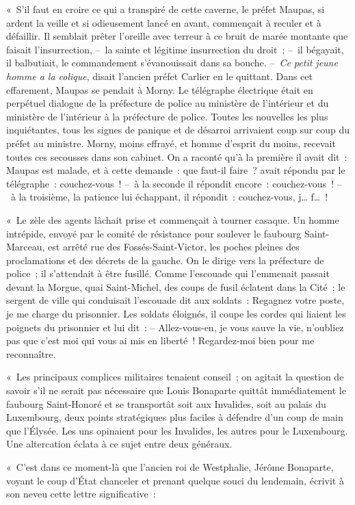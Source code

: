 \documentclass[french,twoside]{book} %
\begin{document}
« S’il faut en croire ce qui a transpiré de cette caverne, le préfet Maupas, si ardent la veille et si odieusement lancé en avant, commençait à reculer et à défaillir. Il semblait prêter l’oreille avec terreur à ce bruit de marée montante que faisait l’insurrection, – la sainte et légitime insurrection du droit ; – il bégayait, il balbutiait, le commandement s’évanouissait dans sa bouche. – \emph{Ce petit jeune homme a la colique}, disait l’ancien préfet Carlier en le quittant. Dans cet effarement, Maupas se pendait à Morny. Le télégraphe électrique était en perpétuel dialogue de la préfecture de police au ministère de l’intérieur et du ministère de l’intérieur à la préfecture de police. Toutes les nouvelles les plus inquiétantes, tous les signes de panique et de désarroi arrivaient coup sur coup du préfet au ministre. Morny, moins effrayé, et homme d’esprit du moins, recevait toutes ces secousses dans son cabinet. On a raconté qu’à la première il avait dit : Maupas est malade, et à cette demande : que faut-il faire ? avait répondu par le télégraphe : couchez-vous ! – à la seconde il répondit encore : couchez-vous ! – à la troisième, la patience lui échappant, il répondit : couchez-vous, j… f… !\par
« Le zèle des agents lâchait prise et commençait à tourner casaque. Un homme intrépide, envoyé par le comité de résistance pour soulever le faubourg Saint-Marceau, est arrêté rue des Fossés-Saint-Victor, les poches pleines des proclamations et des décrets de la gauche. On le dirige vers la préfecture de police ; il s’attendait à être fusillé. Comme l’escouade qui l’emmenait passait devant la Morgue, quai Saint-Michel, des coups de fusil éclatent dans la Cité ; le sergent de ville qui conduisait l’escouade dit aux soldats : Regagnez votre poste, je me charge du prisonnier. Les soldats éloignés, il coupe les cordes qui liaient les poignets du prisonnier et lui dit : – Allez-vous-en, je vous sauve la vie, n’oubliez pas que c’est moi qui vous ai mis en liberté ! Regardez-moi bien pour me reconnaître.\par
« Les principaux complices militaires tenaient conseil ; on agitait la question de savoir s’il ne serait pas nécessaire que Louis Bonaparte quittât immédiatement le faubourg Saint-Honoré et se transportât soit aux Invalides, soit au palais du Luxembourg, deux points stratégiques plus faciles à défendre d’un coup de main que l’Élysée. Les uns opinaient pour les Invalides, les autres pour le Luxembourg. Une altercation éclata à ce sujet entre deux généraux.\par
« C’est dans ce moment-là que l’ancien roi de Westphalie, Jérôme Bonaparte, voyant le coup d’État chanceler et prenant quelque souci du lendemain, écrivit à son neveu cette lettre significative :\par
\end{document}

